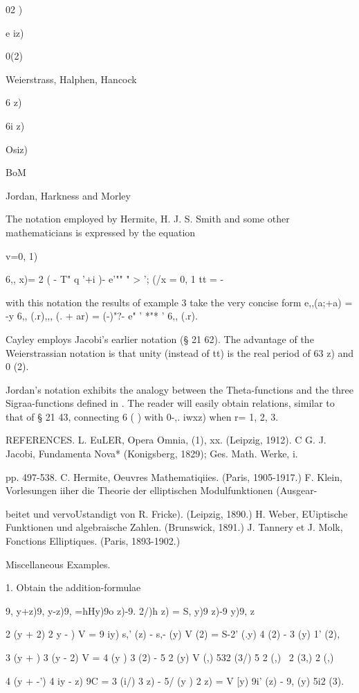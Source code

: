 02 )

e iz)

 0(2)

Weierstrass, Halphen, Hancock

6 z)

6i z)

Osiz)

BoM

Jordan, Harkness and Morley

The notation employed by Hermite, H. J. S. Smith and some other
mathematicians is expressed by the equation

v=0, 1)

6,, x)= 2 ( - T" q '+i )- e'"" " > '; (/x = 0, 1 tt = -

with this notation the results of  example 3 take the very
concise form e,,(a;+a) = -y 6,, (.r),,, (. + ar) = (-)"?- e" '
*"* ' 6,, (.r).

Cayley employs Jacobi's earlier notation (§ 21 62). The advantage of
the Weierstrassian notation is that unity (instead of tt) is the real
period of 63 z) and 0 (2).

Jordan's notation exhibits the analogy between the Theta-functions and
the three Sigraa-functions defined in . The reader will easily
obtain relations, similar to that of § 21 43, connecting 6 ( ) with
0-,. iwxz) when r= 1, 2, 3.

REFERENCES. L. EuLER, Opera Omnia, (1), xx. (Leipzig, 1912). C G. J.
Jacobi, Fundamenta Nova* (Konigsberg, 1829); Ges. Math. Werke, i.

pp. 497-538. C. Hermite, Oeuvres Mathematiqiies. (Paris, 1905-1917.)
F. Klein, Vorlesungen iiher die Theorie der elliptischen
Modulfunktionen (Ausgear-

beitet und vervoUstandigt von R. Fricke). (Leipzig, 1890.) H. Weber,
EUiptische Funktionen und algebraische Zahlen. (Brunswick, 1891.) J.
Tannery et J. Molk, Fonctions Elliptiques. (Paris, 1893-1902.)

Miscellaneous Examples.

1. Obtain the addition-formulae

9, y+z)9, y-z)9, =hHy)9o z)-9. 2/)h z) = S, y)9 z)-9 y)9, z\

 2 (y + 2) 2 y - ) V = 9 iy) s,' (z) - s,- (y) V (2) = S-2' (.y) 4 (2)
- 3 (y) 1' (2),

 3 (y + ) 3 (y - 2) V = 4 (y ) 3 (2) - 5 2 (y) V (,) 532 (3/) 5 2 (,)
\ 2 (3,) 2 (,)

 4 (y + -') 4 iy - z) 9C = 3 (i/) 3 z) - 5/ (y ) 2 z) = V [y) 9i' (z)
- 9, (y) 5i2 (3).

